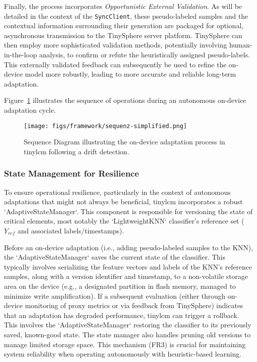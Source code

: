 Finally, the process incorporates \textit{Opportunistic External Validation}. As will be detailed in the context of the \texttt{SyncClient}, these pseudo-labeled samples and the contextual information surrounding their generation are packaged for optional, asynchronous transmission to the TinySphere server platform. TinySphere can then employ more sophisticated validation methods, potentially involving human-in-the-loop analysis, to confirm or refute the heuristically assigned pseudo-labels. This externally validated feedback can subsequently be used to refine the on-device model more robustly, leading to more accurate and reliable long-term adaptation.


Figure~\ref{fig:adaptation_sequence_diagram} illustrates the sequence of operations during an autonomous on-device adaptation cycle.

\begin{figure}[htbp]
    \centering
    \texttt{[image: figs/framework/sequenz-simplified.png]}
    \caption[Sequence Diagram of On-Device Adaptation]{Sequence Diagram illustrating the on-device adaptation process in \gls{tinylcm} following a drift detection.}
    \label{fig:adaptation_sequence_diagram}
\end{figure}

\subsubsection{State Management for Resilience}
\label{sssec:tinylcm_state_management}

To ensure operational resilience, particularly in the context of autonomous adaptations that might not always be beneficial, \gls{tinylcm} incorporates a robust `AdaptiveStateManager`. This component is responsible for versioning the state of critical elements, most notably the `LightweightKNN` classifier's reference set ($Y_{ref}$ and associated labels/timestamps).

Before an on-device adaptation (i.e., adding pseudo-labeled samples to the KNN), the `AdaptiveStateManager` saves the current state of the classifier. This typically involves serializing the feature vectors and labels of the KNN's reference samples, along with a version identifier and timestamp, to a non-volatile storage area on the device (e.g., a designated partition in flash memory, managed to minimize write amplification). If a subsequent evaluation (either through on-device monitoring of proxy metrics or via feedback from TinySphere) indicates that an adaptation has degraded performance, \gls{tinylcm} can trigger a rollback. This involves the `AdaptiveStateManager` restoring the classifier to its previously saved, known-good state. The state manager also handles pruning old versions to manage limited storage space. This mechanism (FR3) is crucial for maintaining system reliability when operating autonomously with heuristic-based learning.

